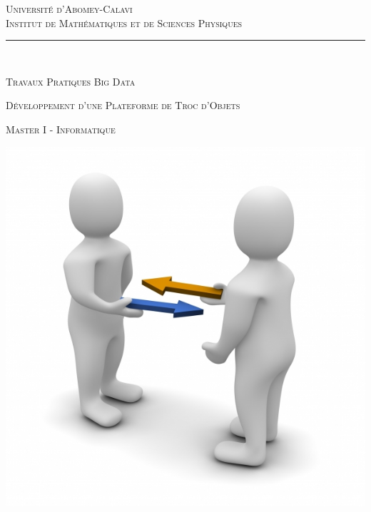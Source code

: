 \documentclass[12pt]{report}
\renewcommand\contentsname{\bf \Large \sc Table des Matières}
\begin{document}
	\thispagestyle{empty}
	\begin{center}
		\textsc{\large Université d'Abomey-Calavi}             							  		\\ \vspace{3em}  %
		\textsc{\Large Institut de Mathématiques et de Sciences Physiques}                   	\\ \vspace{2em}
		
		
		\rule{0.90 \textwidth}{1.5pt}																\\ \vspace{1.2em}

		\textsc{\large Travaux Pratiques Big Data} 	
		
							  		
		\vspace{3em}			
		\textsc{\Large Développement d'une Plateforme de Troc d'Objets} 	\\ 
		
		\vspace{2em}
	
		\textsc{Master I - Informatique}
		
			\begin{center}
				\includegraphics[scale=0.35]{troc4}
				\label{Visual Studio Code}
			\end{center}


\end{center}
\end{document}
